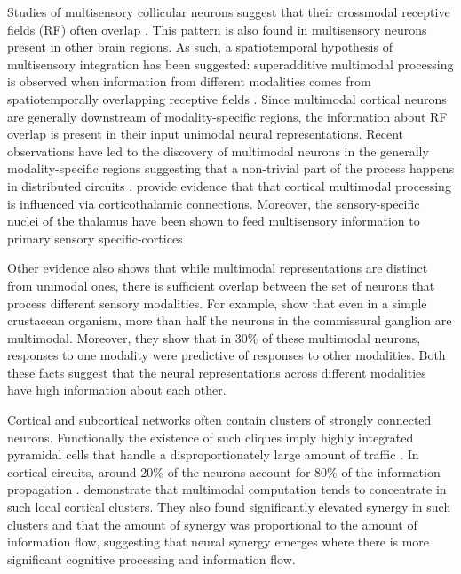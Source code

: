 \documentclass[letterpaper]{article} %
\begin{document}
Studies of multisensory collicular neurons suggest that their crossmodal receptive fields (RF) often overlap \cite{spence2004crossmodal}. This pattern is also found in multisensory neurons present in other brain regions. As such, a spatiotemporal hypothesis of multisensory integration has been suggested: superadditive multimodal processing is observed when information from different modalities comes from spatiotemporally overlapping receptive fields \citep{recanzone2003auditory,wallace2004visual, stanford2005evaluating}. Since multimodal cortical neurons are generally downstream of modality-specific regions, the information about RF overlap is present in their input unimodal neural representations. Recent observations have led to the discovery of multimodal neurons in the generally modality-specific regions suggesting that a non-trivial part of the process happens in distributed circuits \citep{schroeder2005multisensory,stein2008multisensory}. \citet{tyll2011thalamic} provide evidence that that cortical multimodal processing is influenced via corticothalamic connections. Moreover, the sensory-specific nuclei of the thalamus have been shown to feed multisensory information to primary sensory specific-cortices \citep{kayser2008visual}


Other evidence also shows that while multimodal representations are distinct from unimodal ones, there is sufficient overlap between the set of neurons that process different sensory modalities. For example, \citet{follmann2018multimodal} show that even in a simple crustacean organism, more than half the neurons in the commissural ganglion are multimodal. Moreover, they show that in 30\% of these multimodal neurons, responses to one modality were predictive of responses to other modalities. Both these facts suggest that the neural representations across different modalities have high information about each other.


Cortical and subcortical networks often contain clusters of strongly connected neurons. Functionally the existence of such cliques imply highly integrated pyramidal cells that handle a disproportionately large amount of traffic \citep{harriger2012rich}. In cortical circuits, around 20\% of the neurons account for 80\% of the information propagation \citep{nigam2016rich, van2011rich}. \citet{timme2016high, faber2019computation} demonstrate that multimodal computation tends to concentrate in such local cortical clusters. They also found significantly elevated synergy in such clusters and that the amount of synergy was proportional to the amount of information flow, suggesting that neural synergy emerges 
where there is more significant cognitive processing and information flow. 
\end{document}
